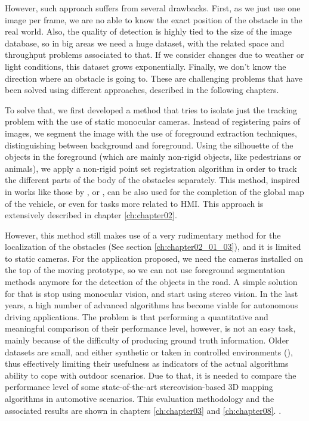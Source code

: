 However, such approach suffers from several drawbacks. First, as we just use one image per frame, we are no able to know the exact position of the obstacle in the real world. Also, the quality of detection is highly tied to the size of the image database, so in big areas we need a huge dataset, with the related space and throughput problems associated to that. If we consider changes due to weather or light conditions, this dataset grows exponentially. Finally, we don't know the direction where an obstacle is going to. These are challenging problems that have been solved using different approaches, described in the following chapters.

To solve that, we first developed a method that tries to isolate just the tracking problem with the use of static monocular cameras. Instead of registering pairs of images, we segment the image with the use of foreground extraction techniques, distinguishing between background and foreground. Using the silhouette of the objects in the foreground (which are mainly non-rigid objects, like pedestrians or animals), we apply a non-rigid point set registration algorithm in order to track the different parts of the body of the obstacles separately. This method, inspired in works like those by \cite{starck2007surface}, or \cite{letouzey2011scene}, can be also used for the completion of the global map of the vehicle, or even for tasks more related to \ac{HMI}. This approach is extensively described in chapter \ref{ch:chapter02}.

However, this method still makes use of a very rudimentary method for the localization of the obstacles (See section \ref{ch:chapter02_01_03}), and it is limited to static cameras. For the application proposed, we need the cameras installed on the top of the moving prototype, so we can not use foreground segmentation methods anymore for the detection of the objects in the road. A simple solution for that is stop using monocular vision, and start using stereo vision. In the last years, a high number of advanced algorithms has become viable for autonomous driving applications. The problem is that performing a quantitative and meaningful comparison of their performance level, however, is not an easy task, mainly because of the difficulty of producing ground truth information. Older datasets are small, and either synthetic or taken in controlled environments (\cite{Scharstein2002}), thus effectively limiting their usefulness as indicators of the actual algorithms ability to cope with outdoor scenarios. Due to that, it is needed to compare the performance level of some state-of-the-art stereovision-based 3D mapping algorithms in automotive scenarios. This evaluation methodology and the associated results are shown in chapters \ref{ch:chapter03} and \ref{ch:chapter08}. .


